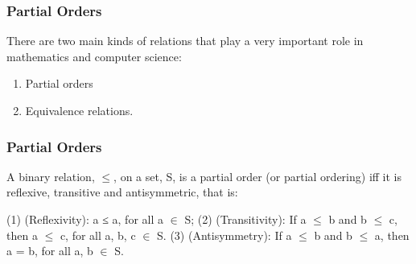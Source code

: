 
\begin{frame}
\frametitle{Partial Orders}
\Large
There are two main kinds of relations that play a very
important role in mathematics and computer science:
\begin{enumerate}
\item Partial orders
\item Equivalence relations.
\end{enumerate}
\end{frame}
\begin{frame}
\frametitle{Partial Orders}
\Large
A binary relation, $\leq$, on a set, S, is
a partial order (or partial ordering) iﬀ it is reﬂexive,
transitive and antisymmetric, that is:

(1) (Reﬂexivity): a ≤ a, for all a $\in$ S;
(2) (Transitivity): If a $\leq$ b and b $\leq$ c, then a $\leq$ c, for
all a, b, c $\in$ S.
(3) (Antisymmetry): If a $\leq$ b and b $\leq$ a, then a = b, for
all a, b $\in$ S.

\end{frame}

